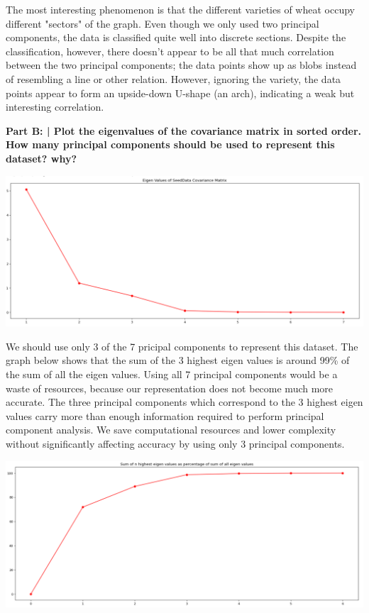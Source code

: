 \documentclass{article}
\begin{document}
 The most interesting phenomenon is that the different varieties of wheat occupy different "sectors" of the graph. Even though we only used two principal components, the data is classified quite well into discrete sections. Despite the classification, however, there doesn't appear to be all that much correlation between the two principal components; the data points show up as blobs instead of resembling a line or other relation. However, ignoring the variety, the data points appear to form an upside-down U-shape (an arch), indicating a weak but interesting correlation.\newline
 
 \textbf{Part B: | Plot the eigenvalues of the covariance matrix in sorted order. How many principal components should be used to represent this dataset? why?}\newline
 
 \includegraphics[scale=0.4]{HW9_6.PNG}\newline
 
 We should use only 3 of the 7 pricipal components to represent this dataset. The graph below shows that the sum of the 3 highest eigen values is around 99\% of the sum of all the eigen values. Using all 7 principal components would be a waste of resources, because our representation does not become much more accurate. The three principal components which correspond to the 3 highest eigen values carry more than enough information required to perform principal component analysis. We save computational resources and lower complexity without significantly affecting accuracy by using only 3 principal components. 
 
 \includegraphics[scale=0.4]{HW9_7.PNG}\newline
\end{document}
